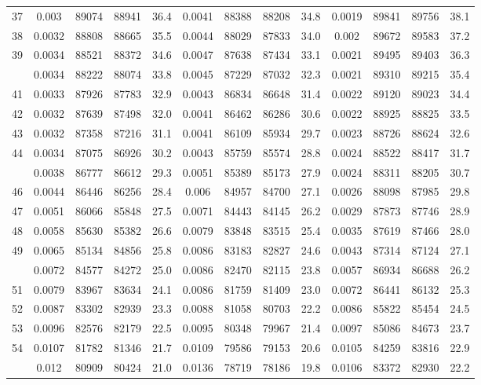 \documentclass[
  14pt,
]{article}
\begin{document}
\begin{longtable}[t]{lcccccccccccc}
37 & 0.003 & 89074 & 88941 & 36.4 & 0.0041 & 88388 & 88208 & 34.8 & 0.0019 & 89841 & 89756 & 38.1\\
38 & 0.0032 & 88808 & 88665 & 35.5 & 0.0044 & 88029 & 87833 & 34.0 & 0.002 & 89672 & 89583 & 37.2\\
39 & 0.0034 & 88521 & 88372 & 34.6 & 0.0047 & 87638 & 87434 & 33.1 & 0.0021 & 89495 & 89403 & 36.3\\
\addlinespace
40 & 0.0034 & 88222 & 88074 & 33.8 & 0.0045 & 87229 & 87032 & 32.3 & 0.0021 & 89310 & 89215 & 35.4\\
41 & 0.0033 & 87926 & 87783 & 32.9 & 0.0043 & 86834 & 86648 & 31.4 & 0.0022 & 89120 & 89023 & 34.4\\
42 & 0.0032 & 87639 & 87498 & 32.0 & 0.0041 & 86462 & 86286 & 30.6 & 0.0022 & 88925 & 88825 & 33.5\\
43 & 0.0032 & 87358 & 87216 & 31.1 & 0.0041 & 86109 & 85934 & 29.7 & 0.0023 & 88726 & 88624 & 32.6\\
44 & 0.0034 & 87075 & 86926 & 30.2 & 0.0043 & 85759 & 85574 & 28.8 & 0.0024 & 88522 & 88417 & 31.7\\
\addlinespace
45 & 0.0038 & 86777 & 86612 & 29.3 & 0.0051 & 85389 & 85173 & 27.9 & 0.0024 & 88311 & 88205 & 30.7\\
46 & 0.0044 & 86446 & 86256 & 28.4 & 0.006 & 84957 & 84700 & 27.1 & 0.0026 & 88098 & 87985 & 29.8\\
47 & 0.0051 & 86066 & 85848 & 27.5 & 0.0071 & 84443 & 84145 & 26.2 & 0.0029 & 87873 & 87746 & 28.9\\
48 & 0.0058 & 85630 & 85382 & 26.6 & 0.0079 & 83848 & 83515 & 25.4 & 0.0035 & 87619 & 87466 & 28.0\\
49 & 0.0065 & 85134 & 84856 & 25.8 & 0.0086 & 83183 & 82827 & 24.6 & 0.0043 & 87314 & 87124 & 27.1\\
\addlinespace
50 & 0.0072 & 84577 & 84272 & 25.0 & 0.0086 & 82470 & 82115 & 23.8 & 0.0057 & 86934 & 86688 & 26.2\\
51 & 0.0079 & 83967 & 83634 & 24.1 & 0.0086 & 81759 & 81409 & 23.0 & 0.0072 & 86441 & 86132 & 25.3\\
52 & 0.0087 & 83302 & 82939 & 23.3 & 0.0088 & 81058 & 80703 & 22.2 & 0.0086 & 85822 & 85454 & 24.5\\
53 & 0.0096 & 82576 & 82179 & 22.5 & 0.0095 & 80348 & 79967 & 21.4 & 0.0097 & 85086 & 84673 & 23.7\\
54 & 0.0107 & 81782 & 81346 & 21.7 & 0.0109 & 79586 & 79153 & 20.6 & 0.0105 & 84259 & 83816 & 22.9\\
\addlinespace
55 & 0.012 & 80909 & 80424 & 21.0 & 0.0136 & 78719 & 78186 & 19.8 & 0.0106 & 83372 & 82930 & 22.2\\

\end{longtable}
\end{document}
